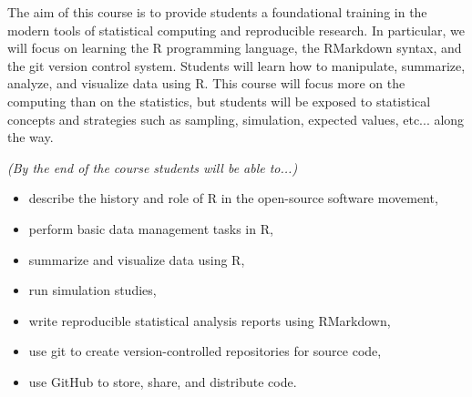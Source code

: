 \documentclass[10pt]{article}
\begin{document}


\bigskip
{}

The aim of this course is to provide students a foundational training in the modern tools of statistical computing and reproducible research. In particular, we will focus on learning the R programming language, the RMarkdown syntax, and the git version control system. Students will learn how to manipulate, summarize, analyze, and visualize data using R. This course will focus more on the computing than on the statistics, but students will be exposed to statistical concepts and strategies such as sampling, simulation, expected values, etc... along the way. 
 


\bigskip
{} {\em (By the end of the course students will be able to...)}

\begin{itemize}
\item describe the history and role of R in the open-source software movement,
\item perform basic data management tasks in R, 
\item summarize and visualize data using R,
\item run simulation studies, 
\item write reproducible statistical analysis reports using RMarkdown,
\item use git to create version-controlled repositories for source code,
\item use GitHub to store, share, and distribute code.
\end{itemize}
    
\end{document}
